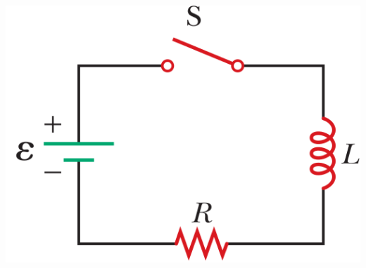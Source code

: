 \documentclass{officialexam}
\begin{document}
\begin{enumerate}[I]
\begin{enumerate}[m]
\begin{multicols}{2}
				\includegraphics[scale=0.25]{pic5}
			\end{multicols}
		\end{enumerate} 
	\end{enumerate}
\end{document}
